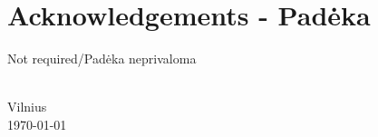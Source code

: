 \chapter*{Acknowledgements - Padėka}
\label{cha:acknowledgements}


Not required/Padėka neprivaloma


{\flushright  \thesisAuthorName \ \thesisAuthorSurname \\ Vilnius\\ \today\\ }
